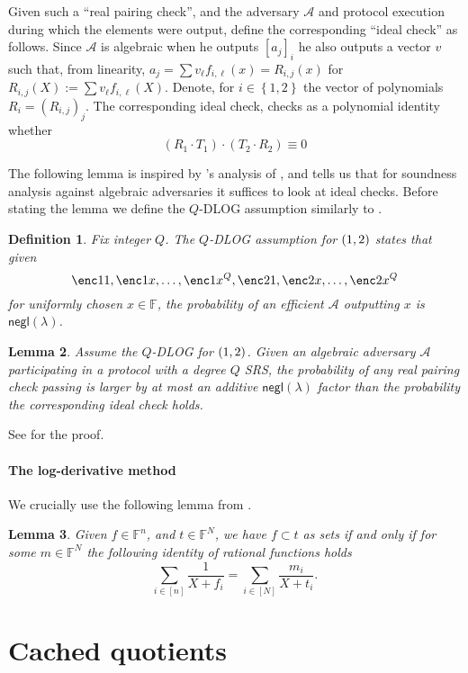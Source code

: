 \documentclass[11pt]{article} %
\newcommand{\F}{\ensuremath{\mathbb F}\xspace}
\newcommand{\adv}{\ensuremath{\mathcal A}\xspace}
\newcommand{\negl}{\ensuremath{\mathsf{negl}(\lambda)}\xspace}
\newcommand{\defeq}{:=}
\newcommand{\enci}[1]{\ensuremath{\left[#1\right]_i}\xspace}
\newcommand{\set}[1]{\ensuremath{\left\{#1\right\}}\xspace}
\newcommand{\sumi}[1]{\sum_{i\in[#1]}}
\newtheorem{lemma}{Lemma}[section]
\newtheorem{dfn}[lemma]{Definition}
\newcommand{\witsize}{\ensuremath{n}\xspace}
\newcommand{\tabsize}{\ensuremath{N}\xspace}
\begin{document}
Given such a ``real pairing check'', and the adversary \adv and protocol execution during which the elements were output, define the corresponding ``ideal check'' as follows.
Since \adv is algebraic when he outputs \enci{a_j} he also outputs a vector $v$ such that, from linearity, $a_j = \sum v_\ell f_{i,\ell}(x)=R_{i,j}(x)$ for $R_{i,j}(X) \defeq \sum v_\ell f_{i,\ell}(X)$.
Denote, for $i\in \set{1,2}$ the vector of polynomials $R_i=(R_{i,j})_j$.
The corresponding ideal check, checks as a polynomial identity whether
\[(R_1 \cdot T_1)\cdot (T_2\cdot R_2) \equiv 0\]


The following lemma is inspired by \cite{AGM}'s analysis of \cite{Groth16},
and tells us that for soundness analysis against algebraic adversaries it suffices to look at ideal checks.
Before stating the lemma we define the $Q$-DLOG assumption similarly to \cite{AGM}.
\begin{dfn}\label{ref:qdlog}
 Fix integer $Q$. The \emph{$Q$-DLOG assumption for $(\G1,\G2)$} states that given 
 \[\enc1{1},\enc1{x},\ldots,\enc1{x^Q},\enc2{1},\enc2{x},\ldots,\enc2{x^Q}\]
 for uniformly chosen $x\in \F$, the probability of an efficient \adv outputting $x$
 is \negl.
\end{dfn}



\begin{lemma}\label{lem:AGManalysis}
Assume the $Q$-DLOG for $(\G1,\G2)$.
 Given an algebraic adversary \adv participating in a protocol with a degree $Q$ SRS,
 the probability of any real pairing check passing is larger by at most an additive \negl factor than the probability the corresponding ideal check holds.
\end{lemma}
See \cite{plonk} for the proof.

\paragraph{The log-derivative method}
We crucially use the following lemma from \cite{mvlookup}.
\begin{lemma}\label{lem:mvlookup}
 Given $f\in \F^\witsize$, and $t\in \F^\tabsize$,
 we have $f\subset t$ as sets if and only if for some $m\in \F^\tabsize$ the following identity of rational functions holds
 \[\sumi{\witsize}\frac{1}{X+f_i}=\sumi{\tabsize}\frac{m_i}{X+t_i}.\]
\end{lemma}

\section{Cached quotients}\label{sec:cachedquo}
\end{document}
